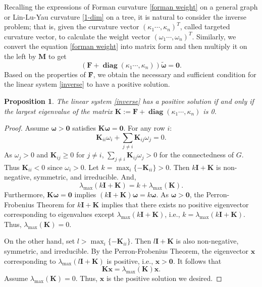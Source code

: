 \documentclass{article}
\newtheorem{proposition}{Proposition}[section]
\begin{document}
Recalling the expressions of Forman curvature \eqref{forman weight} on a general graph or Lin-Lu-Yau curvature \eqref{1-dim} on a tree, it is natural to  consider the inverse problem; that is, given the curvature vector $(\kappa_1\cdots,\kappa_n)^T$, called targeted curvature vector, to calculate the weight vector $(\omega_1\cdots,\omega_n)^T$. Similarly,  we convert the equation \eqref{forman weight}  into matrix form and then multiply it on the left by $\bm M$  to get 
\begin{equation}\label{inverse}
    (\textbf{\~{F}}+\operatorname{\bm{diag}}(\kappa_1\cdots,\kappa_n))\bm{\tilde{\omega}}=\bm 0.
\end{equation}
Based on the properties of \textbf{\~{F}}, we obtain the necessary and sufficient condition for  the linear system \eqref{inverse}
to have a positive solution.
\begin{proposition}
The  linear system \eqref{inverse} has a positive solution if and only if  the largest eigenvalue of the matrix \(\textbf{K}:=\textbf{\~{F}}+\operatorname{\bm{diag}}(\kappa_1\cdots,\kappa_n)\) is 0.
\end{proposition}
\begin{proof}
Assume \(\bm{\omega} > \mathbf{0}\) satisfies \( \textbf{K}\bm \omega = \mathbf{0} \). For any row \( i \): 
    \[
        \textbf{K}_{ii} \omega_i + \sum_{j \neq i} \textbf{K}_{ij} \omega_j = 0.
    \]
    As \( \omega_j > 0 \) and \( \textbf{K}_{ij} \geq 0 \) for \( j \neq i \), \(\sum_{j \neq i} \textbf{K}_{ij} \omega_j>0\) for the connectedness of $G$. Thus \( \textbf{K}_{ii} < 0 \) since \( \omega_i > 0 \). Let \( k =\max_i \{-\textbf{K}_{ii}\}>0\).
    Then \( k\textbf{I} +\textbf{K} \) is non-negative, symmetric, and irreducible. And,
    \[
        \lambda_{\max}(k\textbf{I} +\textbf{K}) =  k + \lambda_{\max}(\textbf{K}).
    \]
    Furthermore, \( \textbf{K}\bm \omega = \mathbf{0} \) implies \( (k\textbf{I} +\textbf{K})\bm \omega = k\bm \omega \). As \(\bm \omega> \mathbf{0}\), the Perron-Frobenius Theorem for \( k\textbf{I} +\textbf{K}\) implies that there exists no positive eigenvector corresponding to eigenvalues except $\lambda_{\max}(k\textbf{I} +\textbf{K})$, i.e., \( k = \lambda_{\max}(k\textbf{I}+\textbf{K}) \). 
    Thus, \(\lambda_{\max}(\textbf{K}) = 0 \).

On the other hand, set $l>\max_i \{-\textbf{K}_{ii}\}$.
Then \( l\textbf{I} +\textbf{K}\) is also non-negative, symmetric, and irreducible. 
By the Perron-Frobenius Theorem,  the eigenvector $\bm x$ corresponding to \( \lambda_{\max}(l\textbf{I} +\textbf{K}) \) is positive, i.e., \(\bm x > \mathbf{0}\). It follows that 
    \[
   \textbf{K}\bm x=\lambda_{\max}(\textbf{K})\bm x.
    \]
Assume \( \lambda_{\max}(\textbf{K})= 0 \). Thus, \(\bm x\) is the positive solution we desired.

\end{proof}
\end{document}
